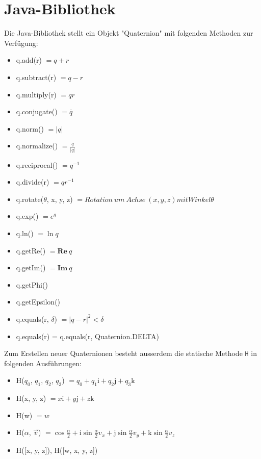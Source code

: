 \documentclass[12pt]{article}
\begin{document}
  \section{Java-Bibliothek}

  Die Java-Bibliothek stellt ein Objekt "Quaternion" mit folgenden Methoden zur Verfügung:
  \begin{itemize}
    \item q.add(r) $= q + r$
    \item q.subtract(r) $= q - r$
    \item q.multiply(r) $= q r$
    \item q.conjugate() $= \bar{q}$
    \item q.norm() $= \lvert q \rvert$
    \item q.normalize() $= \frac{q}{\lvert q \rvert}$
    \item q.reciprocal() $= q^{-1}$
    \item q.divide(r) $= q r^{-1}$
    \item q.rotate($\theta$, x, y, z) $= Rotation\ um\ Achse\ (x, y, z) mit Winkel \theta$
    \item q.exp() $= e^q$
    \item q.ln() $= \ln q$
    \item q.getRe() $= \mathbf{Re}\ q$
    \item q.getIm() $= \mathbf{Im}\ q$
    \item q.getPhi()
    \item q.getEpsilon()
    \item q.equals(r, $\delta$) $= |q - r|^2 < \delta$
    \item q.equals(r) = q.equals(r, Quaternion.DELTA)
  \end{itemize}

  Zum Erstellen neuer Quaternionen besteht ausserdem die statische Methode \texttt{H} in folgenden Ausführungen:
  \begin{itemize}
    \item H($q_0$, $q_1$, $q_2$, $q_3$) $= q_0 + q_1 \mathrm{i} + q_2 \mathrm{j} + q_3 \mathrm{k}$
    \item H(x, y, z) $= x \mathrm{i} + y \mathrm{j} + z \mathrm{k}$
    \item H(w) $= w$
    \item H($\alpha$, $\vec{v}$) $= \cos\frac{\alpha}{2} + \mathrm{i} \sin\frac{\alpha}{2} v_x + \mathrm{j} \sin\frac{\alpha}{2} v_y + \mathrm{k} \sin\frac{\alpha}{2} v_z$
    \item H([x, y, z]), H([w, x, y, z])
  \end{itemize}
\end{document}
